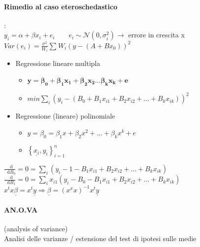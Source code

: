 \documentclass[]{article}
\newcommand*{\diff}{\mathop{}\!\mathrm{d}}
\begin{document}
    \paragraph{Rimedio al caso eteroschedastico}: \\
    $\displaystyle y_i = \alpha + \beta x_i + e_i \qquad e_i \sim \mathcal{N}(0, \sigma^2_i) \rightarrow$ errore in crescita x \\
    $\displaystyle Var(e_i) = \frac{\sigma^2}{W_i} \sum_{}^{} W_i (y - (A + B x_0))^2$
    \begin{itemize}
        \item Regressione lineare multipla
        \begin{itemize}
            \item $\mathbf{y = \beta_0 + \beta_1 x_1 + \beta_2 x_2 \ldots \beta_k x_k + e}$
            \item $min \sum_{i}^{} (y_i - (B_0 + B_1 x_{i1} + B_2 x_{i2} + \ldots + B_k x_{ik}))^2$
        \end{itemize}
        \item Regressione (lineare) polinomiale
        \begin{itemize}
            \item $y = \beta_0 = \beta_{1} x + \beta_2 x^2 + \ldots + \beta_k x^k + e$
            \item $\left\{ \underline{x_i}, y_i \right\}^n_{i=1}$
        \end{itemize}
    \end{itemize}
    $\displaystyle\frac{\diff}{\diff B_0} = 0 = \sum_{i}^{} (y_i - 1 - B_1 x_{i1} + B_2 x_{i2} + \ldots + B_k x_{ik})$ \\
    $\displaystyle\frac{\diff}{\diff B_1} = 0 = \sum_{i}^{} x_{i1} (y_i - B_0 - B_1 x_{i1} + B_2 x_{i2} + \ldots + B_k x_{ik})$ \\[4ex]
    $x^t x\underline{\beta} = x^t \underline{y} \Longrightarrow \underline{\beta} = (x^x x)^{-1} x^t \underline{y}$ \\
    \paragraph{AN.O.VA} (analysis of variance) \\
    Analisi delle varianze / estensione del test di ipotesi sulle medie
\end{document}
